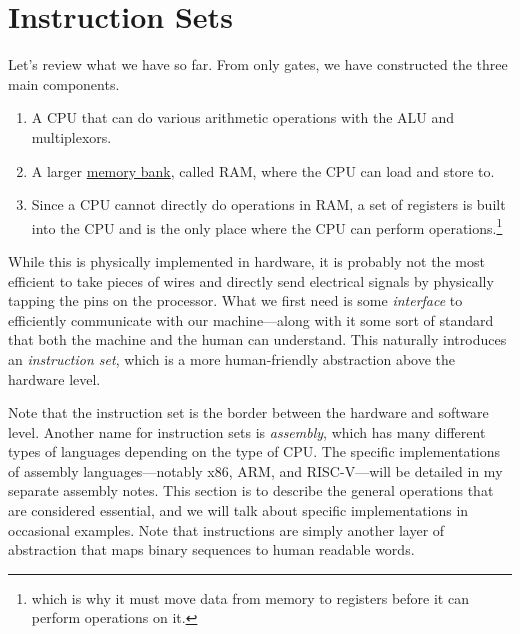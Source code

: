 \section{Instruction Sets} 
  
  Let's review what we have so far. From only gates, we have constructed the three main components. 
  \begin{enumerate}
    \item A CPU that can do various arithmetic operations with the ALU and multiplexors. 
    \item A larger \hyperref[def:memory-bank]{memory bank}, called RAM, where the CPU can load and store to. 
    \item Since a CPU cannot directly do operations in RAM, a set of registers is built into the CPU and is the only place where the CPU can perform operations.\footnote{which is why it must move data from memory to registers before it can perform operations on it.}
  \end{enumerate}

  While this is physically implemented in hardware, it is probably not the most efficient to take pieces of wires and directly send electrical signals by physically tapping the pins on the processor. What we first need is some \textit{interface} to efficiently communicate with our machine---along with it some sort of standard that both the machine and the human can understand. This naturally introduces an \textit{instruction set}, which is a more human-friendly abstraction above the hardware level. 

  Note that the instruction set is the border between the hardware and software level. Another name for instruction sets is \textit{assembly}, which has many different types of languages depending on the type of CPU. The specific implementations of assembly languages---notably x86, ARM, and RISC-V---will be detailed in my separate assembly notes. This section is to describe the general operations that are considered essential, and we will talk about specific implementations in occasional examples. Note that instructions are simply another layer of abstraction that maps binary sequences to human readable words. 

